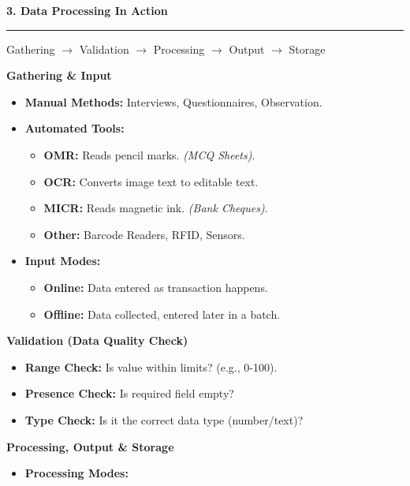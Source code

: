 \documentclass[a4paper, 8pt]{extarticle}
\newcommand{\sectionheading}[1]{\large\textbf{#1}\par\noindent\rule{\linewidth}{0.4pt}}
\newcommand{\subsectionheading}[1]{\normalsize\textbf{#1}}
\begin{document}
\begin{multicols}{2}
\columnbreak %


\sectionheading{3. Data Processing In Action}
\vspace{0.5em}
\begin{tcolorbox}[title=\textbf{Data Processing Cycle}]
Gathering $\rightarrow$ Validation $\rightarrow$ Processing $\rightarrow$ Output $\rightarrow$ Storage
\end{tcolorbox}
\subsectionheading{Gathering \& Input}
\begin{itemize}
    \item \textbf{Manual Methods:} Interviews, Questionnaires, Observation.
    \item \textbf{Automated Tools:}
        \begin{itemize}
            \item \textbf{OMR:} Reads pencil marks. \textit{(MCQ Sheets)}.
            \item \textbf{OCR:} Converts image text to editable text.
            \item \textbf{MICR:} Reads magnetic ink. \textit{(Bank Cheques)}.
            \item \textbf{Other:} Barcode Readers, RFID, Sensors.
        \end{itemize}
    \item \textbf{Input Modes:}
        \begin{itemize}
            \item \textbf{Online:} Data entered as transaction happens.
            \item \textbf{Offline:} Data collected, entered later in a batch.
        \end{itemize}
\end{itemize}
\subsectionheading{Validation (Data Quality Check)}
\begin{itemize}
    \item \textbf{Range Check:} Is value within limits? (e.g., 0-100).
    \item \textbf{Presence Check:} Is required field empty?
    \item \textbf{Type Check:} Is it the correct data type (number/text)?
\end{itemize}
\subsectionheading{Processing, Output \& Storage}
\begin{itemize}
    \item \textbf{Processing Modes:}

\end{itemize}
\end{multicols}
\end{document}
